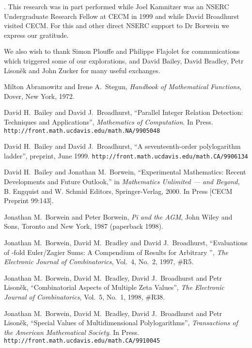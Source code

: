 \documentclass[a4paper,a4paper]{article}
\begin{document}
\vspace{\baselineskip}
\vfill
{}.  This research was in part
performed while Joel Kamnitzer was an NSERC Undergraduate Research Fellow
at CECM in 1999 and while David Broadhurst visited CECM. For this and
other direct NSERC support to Dr Borwein we express our gratitude.

We also wish to thank Simon Plouffe and Philippe Flajolet for communications
which triggered some of our explorations, and David Bailey, David
Bradley, Petr Lison\v ek and John Zucker for many useful exchanges.

\raggedright
\begin{thebibliography}{99}

Milton Abramowitz and Irene A.\ Stegun,
{\it Handbook of Mathematical Functions},
Dover, New York, 1972.

David H.\ Bailey and David J.\ Broadhurst,
``Parallel Integer Relation Detection: Techniques and Applications'',
{\it Mathematics of Computation}. In Press.
{\tt http://front.math.ucdavis.edu/math.NA/9905048}

David H.\ Bailey and David J.\ Broadhurst,
``A seventeenth-order polylogarithm ladder'',
preprint, June 1999.
{\tt http://front.math.ucdavis.edu/math.CA/9906134}

 David H.\ Bailey and Jonathan M.\ Borwein,
``Experimental Mathematics: Recent
Developments and Future Outlook,'' in  {\it Mathematics Unlimited ---
\coordHE{} and Beyond,} B. Engquist and W. Schmid Editors,
Springer-Verlag, 2000. In Press [CECM Preprint 99:143].

Jonathan M.\ Borwein and Peter Borwein,
{\it Pi and the AGM},
John Wiley and Sons, Toronto  and New York, 1987 (paperback 1998).

Jonathan M.\ Borwein, David M.\ Bradley and David J.\ Broadhurst,
``Evaluations of \coordHE{}-fold Euler/Zagier Sums:
A Compendium of Results for Arbitrary \coordHE{}'',
{\it The Electronic Journal of Combinatorics},
Vol.~4, No.~2, 1997, \#R5.

Jonathan M.\ Borwein, David M.\ Bradley, David J.\ Broadhurst
and Petr Lison\v ek,
``Combinatorial Aspects of Multiple Zeta Values'',
{\it The Electronic Journal of Combinatorics},
Vol.~5, No.~1, 1998, \#R38.

Jonathan M.\ Borwein, David M.\ Bradley, David J.\ Broadhurst
and Petr Lison\v ek,
``Special Values of Multidimensional Polylogarithms'',
{\it Transactions of the American Mathematical Society}. In Press.
{\tt http://front.math.ucdavis.edu/math.CA/9910045}


\end{thebibliography}
\end{document}
